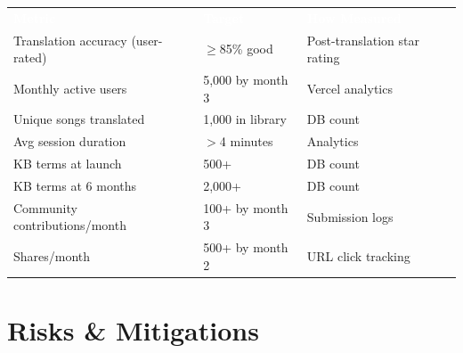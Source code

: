 \documentclass[12pt, a4paper]{article}
\begin{document}
\renewcommand{\arraystretch}{1.5}
\begin{center}
\begin{tabular}{L{4.5cm} L{3cm} L{6cm}}
  \textcolor{white}{\textbf{Metric}} &
  \textcolor{white}{\textbf{Target}} &
  \textcolor{white}{\textbf{How Measured}} \\
  Translation accuracy (user-rated) & $\geq$85\% good &
  Post-translation star rating \\
  Monthly active users & 5,000 by month 3 &
  Vercel analytics \\
  Unique songs translated & 1,000 in library &
  DB count \\
  Avg session duration & $>$4 minutes &
  Analytics \\
  KB terms at launch & 500+ &
  DB count \\
  KB terms at 6 months & 2,000+ &
  DB count \\
  Community contributions/month & 100+ by month 3 &
  Submission logs \\
  Shares/month & 500+ by month 2 &
  URL click tracking \\
\end{tabular}
\end{center}

\section{Risks \& Mitigations}
\end{document}
